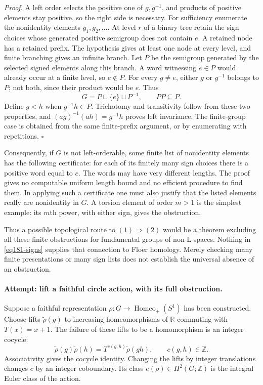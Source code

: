\documentclass[11pt,a4paper]{article}
\newcommand{\Z}{\mathbb{Z}}
\newcommand{\R}{\mathbb{R}}
\numberwithin{equation}{section}
\begin{document}
\textit{Proof.} A left order selects the positive one of $g,g^{-1}$,
and products of positive elements stay positive, so the right side is
necessary. For sufficiency enumerate the nonidentity elements
$g_1,g_2,\ldots$. At level $r$ of a binary tree retain the sign choices
whose generated positive semigroup does not contain $e$. A retained node
has a retained prefix. The hypothesis gives at least one node at every
level, and finite branching gives an infinite branch. Let $P$ be the
semigroup generated by the selected signed elements along this branch.
A word witnessing $e\in P$ would already occur at a finite level, so
$e\notin P$. For every $g\ne e$, either $g$ or $g^{-1}$ belongs to $P$;
not both, since their product would be $e$. Thus
\[
               G=P\sqcup\{e\}\sqcup P^{-1},\qquad PP\subseteq P.
\]
Define $g<h$ when $g^{-1}h\in P$. Trichotomy and transitivity follow from
these two properties, and $(ag)^{-1}(ah)=g^{-1}h$ proves left invariance.
The finite-group case is obtained from the same finite-prefix argument,
or by enumerating with repetitions. \hfill$\square$

Consequently, if $G$ is not left-orderable, some finite list of nonidentity
elements has the following certificate: for each of its finitely many sign
choices there is a positive word equal to $e$. The words may have very
different lengths. The proof gives no computable uniform length bound and
no efficient procedure to find them. In applying such a certificate one
must also justify that the listed elements really are nonidentity in $G$.
A torsion element of order $m>1$ is the simplest example: its $m$th power,
with either sign, gives the obstruction.

Thus a possible topological route to $(1)\Rightarrow(2)$ would be a theorem
excluding all these finite obstructions for fundamental groups of non-L-spaces.
Nothing in \eqref{eq181-signs} supplies that connection to Floer homology.
Merely checking many finite presentations or many sign lists does not
establish the universal absence of an obstruction.

\paragraph{Attempt: lift a faithful circle action, with its full obstruction.}
Suppose a faithful representation
$\rho:G\to\operatorname{Homeo}_+(S^1)$ has been constructed. Choose lifts
$\widetilde\rho(g)$ to increasing homeomorphisms of $\R$ commuting with
$T(x)=x+1$. The failure of these lifts to be a homomorphism is an integer
cocycle:
\[
 \widetilde\rho(g)\widetilde\rho(h)
       =T^{c(g,h)}\widetilde\rho(gh),\qquad c(g,h)\in\Z.
\]
Associativity gives the cocycle identity. Changing the lifts by integer
translations changes $c$ by an integer coboundary. Its class
$e(\rho)\in H^2(G;\Z)$ is the integral Euler class of the action.
\end{document}
